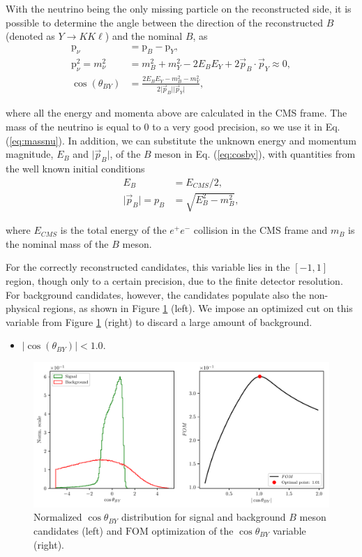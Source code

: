 With the neutrino being the only missing particle on the reconstructed side, it is possible to determine the angle between the direction of the reconstructed $B$ (denoted as $Y \to K K \ell$) and the nominal $B$, as
\begin{align}
\mathrm{p}_\nu &= \mathrm{p}_B - \mathrm{p}_{Y}, \\
\label{eq:massnu}
\mathrm{p}_\nu^2 = m_\nu^2 &= m_B^2 + m_Y^2 - 2E_BE_Y + 2\vec{p}_B \cdot \vec{p}_Y \approx 0, \\ 
\label{eq:cosby}
\cos \left(\theta_{BY}\right) &= \frac{2E_BE_Y - m_B^2 - m_Y^2}{2\vert \vec{p}_B \vert \vert \vec{p}_Y\vert},
\end{align} 

where all the energy and momenta above are calculated in the CMS frame. The mass of the neutrino is equal to 0 to a very good precision, so we use it in Eq. (\ref{eq:massnu}). In addition, we can substitute the unknown energy and momentum magnitude, $E_B$ and $\vert \vec{p}_B \vert$, of the $B$ meson in Eq. (\ref{eq:cosby}), with quantities from the well known initial conditions
\begin{align}
E_B &= E_{CMS} / 2,\\
\vert \vec{p}_B \vert = p_B &= \sqrt{E_B^2 - m_B^2},
\end{align} 

where $E_{CMS}$ is the total energy of the $e^+e^-$ collision in the CMS frame and $m_B$ is the nominal mass of the $B$ meson. 

For the correctly reconstructed candidates, this variable lies in the $[-1,1]$ region, though only to a certain precision, due to the finite detector resolution. For background candidates, however, the candidates populate also the non-physical regions, as shown in Figure \ref{fig:cosby} (left). We impose an optimized cut on this variable from Figure \ref{fig:cosby} (right) to discard a large amount of background.
\begin{itemize}
\item $\vert \cos \left(\theta_{BY}\right) \vert < 1.0$.
\end{itemize}

\begin{figure}[H]
\centering
\captionsetup{width=.8\linewidth}
\includegraphics[width=\linewidth]{fig/cosBY}
\caption{Normalized $\cos \theta_{BY}$ distribution for signal and background $B$ meson candidates (left) and $\mathrm{FOM}$ optimization of the $\cos \theta_{BY}$ variable (right).}
\label{fig:cosby}
\end{figure}

